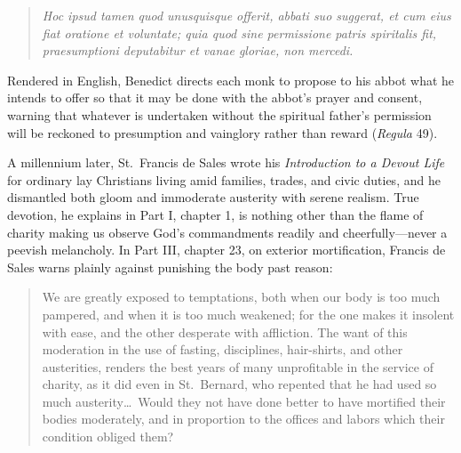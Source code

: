 \begin{quote}
\emph{Hoc ipsud tamen quod unusquisque offerit, abbati suo suggerat, et cum eius fiat oratione et voluntate; quia quod sine permissione patris spiritalis fit, praesumptioni deputabitur et vanae gloriae, non mercedi.}
\end{quote}

Rendered in English, Benedict directs each monk to propose to his abbot what he intends to offer so that it may be done with the abbot's prayer and consent, warning that whatever is undertaken without the spiritual father's permission will be reckoned to presumption and vainglory rather than reward (\emph{Regula} 49).

A millennium later, St.\ Francis de Sales wrote his \emph{Introduction to a Devout Life} for ordinary lay Christians living amid families, trades, and civic duties, and he dismantled both gloom and immoderate austerity with serene realism. True devotion, he explains in Part I, chapter 1, is nothing other than the flame of charity making us observe God's commandments readily and cheerfully---never a peevish melancholy. In Part III, chapter 23, on exterior mortification, Francis de Sales warns plainly against punishing the body past reason:

\begin{quote}
We are greatly exposed to temptations, both when our body is too much pampered, and when it is too much weakened; for the one makes it insolent with ease, and the other desperate with affliction. The want of this moderation in the use of fasting, disciplines, hair-shirts, and other austerities, renders the best years of many unprofitable in the service of charity, as it did even in St.\ Bernard, who repented that he had used so much austerity\dots\ Would they not have done better to have mortified their bodies moderately, and in proportion to the offices and labors which their condition obliged them?
\end{quote}

